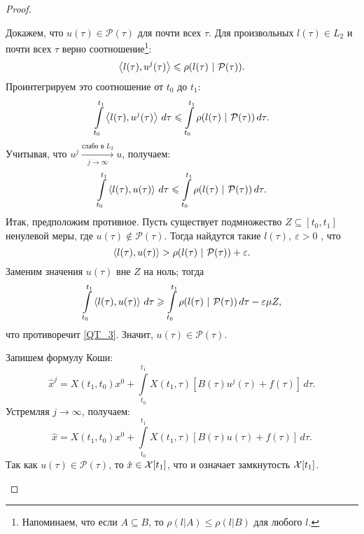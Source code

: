 \begin{proof}
\begin{enumerate}
    Докажем, что $u(\tau) \in \mathcal{P}(\tau)$ для почти всех $\tau$.
    Для произвольных $l(\tau) \in L_2$ и почти всех $\tau$ верно 
    соотношение\footnote{Напоминаем,
    что если $A\subseteq B$,
    то $\rho(l|A) \leqslant \rho(l|B)$ для любого $l$.}:
    \begin{equation*}
      \scalar{l(\tau)}{u^j(\tau)}\leqslant\rho(l(\tau)\ |\ \mathcal{P}(\tau)).
    \end{equation*} 
    Проинтегрируем это соотношение от $t_0$ до $t_1$:
    \begin{equation*}
      \int\limits_{t_0}^{t_1}\scalar{l(\tau)}{u^j(\tau)}\,d\tau \leqslant
      \int\limits_{t_0}^{t_1}\rho(l(\tau)\ |\ \mathcal{P}(\tau))\,d\tau.
    \end{equation*} 
    Учитывая, что
    $u^j \xrightarrow[j \rightarrow \infty]{\text{слабо в } L_2}u$, получаем:
    \begin{equation}\label{QT_3}
      \int\limits_{t_0}^{t_1}\scalar{l(\tau)}{u(\tau)}\,d\tau \leqslant
      \int\limits_{t_0}^{t_1}\rho(l(\tau)\ |\ \mathcal{P}(\tau))\,d\tau.
    \end{equation} 
    Итак, предположим противное.
    Пусть существует подмножество $Z \subseteq[t_0, t_1]$ ненулевой меры,
    где $u(\tau) \notin \mathcal{P}(\tau)$.
    Тогда найдутся такие $l(\tau),\ \varepsilon > 0$ , что 
    \begin{equation*}
      \left<l(\tau),u(\tau)\right> >
      \rho(l(\tau)\ |\ \mathcal{P}(\tau)) + \varepsilon.
    \end{equation*}
    Заменим значения $u(\tau)$ вне $Z$ на ноль; тогда 
    \begin{equation*}
      \int\limits_{t_0}^{t_1}\left<l(\tau),u(\tau)\right>\,d\tau \geqslant
      \int\limits_{t_0}^{t_1}\rho(l(\tau)\ |\ \mathcal{P}(\tau))\,d\tau -
          \varepsilon\mu{Z},
    \end{equation*} 
    что противоречит \eqref{QT_3}.
    Значит, $u(\tau) \in \mathcal{P}(\tau)$. 

    Запишем формулу Коши:
    \begin{equation*}
      \hat{x}^j = X(t_1, t_0)x^0 +
                  \int\limits_{t_0}^{t_1}X(t_1, \tau)
                      [B(\tau)u^j(\tau) + f(\tau)]\,d\tau. 
    \end{equation*}
    Устремляя $j \to \infty$, получаем: 
    \begin{equation*}
      \hat{x} = X(t_1, t_0)x^0 +
                \int\limits_{t_0}^{t_1}X(t_1, \tau)
                    [B(\tau)u(\tau) + f(\tau)]\,d\tau. 
    \end{equation*}
    Так как $u(\tau) \in \mathcal{P}(\tau)$,
    то $\hat{x} \in \mathcal{X}[t_1]$,
    что и означает замкнутость $\mathcal{X}[t_1]$.
  \end{enumerate}
\end{proof}

